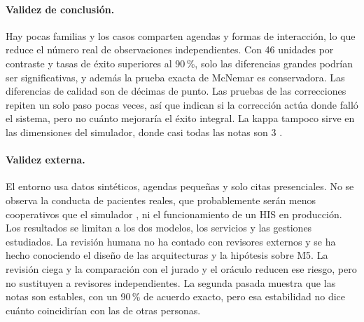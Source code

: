 \paragraph{Validez de conclusión.}
Hay pocas familias y los casos comparten agendas y formas de interacción, lo que
reduce el número real de observaciones independientes. Con 46 unidades por
contraste y tasas de éxito superiores al 90\,\%, solo las diferencias grandes
podrían ser significativas, y además la prueba exacta de McNemar es
conservadora. Las diferencias de calidad son de décimas de punto. Las pruebas
de las correcciones repiten un solo paso pocas veces, así que indican si la
corrección actúa donde falló el sistema, pero no cuánto mejoraría el éxito
integral. La kappa tampoco sirve en las dimensiones del simulador, donde casi
todas las notas son 3 \citep{feinstein1990kappa}.

\paragraph{Validez externa.}
El entorno usa datos sintéticos, agendas pequeñas y solo citas presenciales. No
se observa la conducta de pacientes reales, que probablemente serán menos
cooperativos que el simulador \citep{zhou2026sim2real}, ni el funcionamiento de
un HIS en producción. Los resultados se limitan a los dos modelos, los
servicios y las gestiones estudiados. La revisión humana no ha contado con
revisores externos y se ha hecho conociendo el diseño de las arquitecturas y la
hipótesis sobre M5. La revisión ciega y la comparación con el jurado y el
oráculo reducen ese riesgo, pero no sustituyen a revisores independientes. La
segunda pasada muestra que las notas son estables, con un 90\,\% de acuerdo
exacto, pero esa estabilidad no dice cuánto coincidirían con las de otras
personas.
